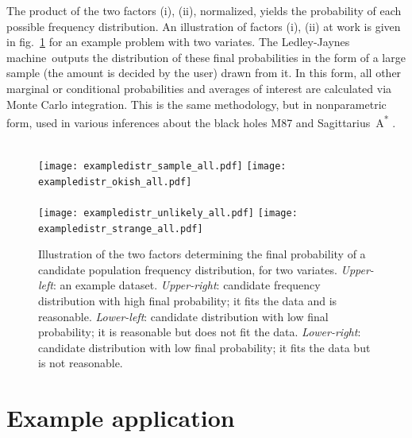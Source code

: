 \documentclass[utf8]{FrontiersinHarvard} %
\newcommand*{\fig}{fig.}%
\renewcommand*{\|}[1][]{\nonscript\:#1\vert\nonscript\:\mathopen{}}
\newcommand*{\ljm}{Ledley-Jaynes machine}
\begin{document}
The product of the two factors (i), (ii), normalized, yields the probability of each possible frequency distribution. An illustration of factors (i), (ii) at work is given in \fig~\ref{fig:inferring_distribution} for an example problem with two variates. The \ljm\ outputs the distribution of these final probabilities in the form of a large sample (the amount is decided by the user) drawn from it. In this form, all other marginal or conditional probabilities and averages of interest are calculated via Monte Carlo integration. This is the same methodology, but in nonparametric form, used in various inferences about the black holes M87 and Sagittarius~A\textsuperscript{*} \citep{eht2019,eht2022}.
\begin{figure}[t]
\centering%
%
\hfill%
%
\\[-2em]
\texttt{[image: exampledistr\_sample\_all.pdf]}%
\hfill%
\texttt{[image: exampledistr\_okish\_all.pdf]}%
\\
%
\hfill%
%
\\[-2em]
  \texttt{[image: exampledistr\_unlikely\_all.pdf]}
  \hfill
  \texttt{[image: exampledistr\_strange\_all.pdf]}
  \caption{Illustration of the two factors determining the final probability of a candidate population frequency distribution, for two variates. \emph{Upper-left}: an example dataset. \emph{Upper-right}: candidate frequency distribution with high final probability; it fits the data and is reasonable. \emph{Lower-left}: candidate distribution with low final probability; it is reasonable but does not fit the data. \emph{Lower-right}: candidate distribution with low final probability; it fits the data but is not reasonable.}\label{fig:inferring_distribution}
\end{figure}%




\newpage%
\section{Example application}
\label{sec:application}
\end{document}
